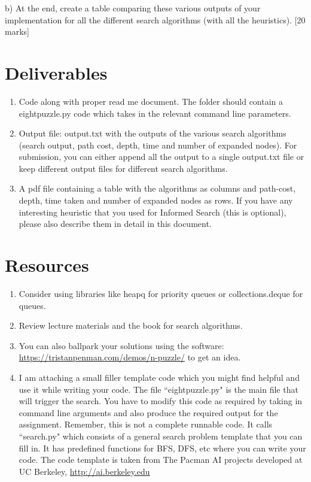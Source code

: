 \documentclass{article}
\begin{document}
\noindent b) At the end, create a table comparing these various outputs of your implementation for all the different search algorithms (with all the heuristics). [20 marks]\\

\section {Deliverables}
\begin{enumerate}
    \item Code along with proper read me document. The folder should contain a eightpuzzle.py code which takes in the relevant command line parameters.
    \item Output file: output.txt with the outputs of the various search algorithms (search output, path cost, depth, time and number of expanded nodes). For submission, you can either append all the output to a single output.txt file or keep different output files for different search algorithms. 
    \item A pdf file containing a table with the algorithms as columns and path-cost, depth, time taken and number of expanded nodes as rows. If you have any interesting heuristic that you used for Informed Search (this is optional), please also describe them in detail in this document.
\end{enumerate}

\section {Resources}
\begin{enumerate}
    \item  Consider using libraries like heapq for priority queues or collections.deque for queues.
    \item Review lecture materials and the book for search algorithms.
    \item You can also ballpark your solutions using the software: \href{https://tristanpenman.com/demos/n-puzzle/}{https://tristanpenman.com/demos/n-puzzle/} to get an idea.
    \item I am attaching a small filler template code which you might find helpful and use it while writing your code. The file ``eightpuzzle.py" is the main file that will trigger the search. You have to modify this code as required by taking in command line arguments and also produce the required output for the assignment. Remember, this is not a complete runnable code. It calls ``search.py" which consists of a general search problem template that you can fill in. It has predefined functions for BFS, DFS, etc where you can write your code.  The code template is taken from The Pacman AI projects developed at UC Berkeley, \href{http://ai.berkeley.edu}{http://ai.berkeley.edu}
\end{enumerate}
\end{document}
